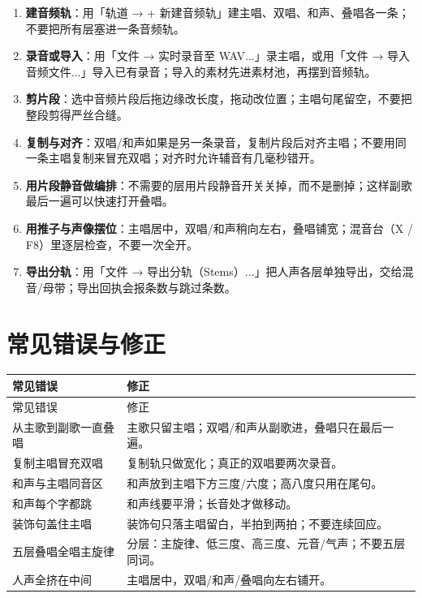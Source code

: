 \begin{enumerate}
\item \textbf{建音频轨}：用「轨道 → + 新建音频轨」建主唱、双唱、和声、叠唱各一条；不要把所有层塞进一条音频轨。
\item \textbf{录音或导入}：用「文件 → 实时录音至 WAV...」录主唱，或用「文件 → 导入音频文件...」导入已有录音；导入的素材先进素材池，再摆到音频轨。
\item \textbf{剪片段}：选中音频片段后拖边缘改长度，拖动改位置；主唱句尾留空，不要把整段剪得严丝合缝。
\item \textbf{复制与对齐}：双唱/和声如果是另一条录音，复制片段后对齐主唱；不要用同一条主唱复制来冒充双唱；对齐时允许辅音有几毫秒错开。
\item \textbf{用片段静音做编排}：不需要的层用片段静音开关关掉，而不是删掉；这样副歌最后一遍可以快速打开叠唱。
\item \textbf{用推子与声像摆位}：主唱居中，双唱/和声稍向左右，叠唱铺宽；混音台（X / F8）里逐层检查，不要一次全开。
\item \textbf{导出分轨}：用「文件 → 导出分轨（Stems）...」把人声各层单独导出，交给混音/母带；导出回执会报条数与跳过条数。
\end{enumerate}


\section{常见错误与修正}
\label{sec:vocal-mistakes}

\begin{longtable}{p{}p{}}
\toprule
常见错误 & 修正 \\
\midrule
\endfirsthead
\toprule
常见错误 & 修正 \\
\midrule
\endhead
从主歌到副歌一直叠唱 & 主歌只留主唱；双唱/和声从副歌进，叠唱只在最后一遍。 \\
复制主唱冒充双唱 & 复制轨只做宽化；真正的双唱要两次录音。 \\
和声与主唱同音区 & 和声放到主唱下方三度/六度；高八度只用在尾句。 \\
和声每个字都跳 & 和声线要平滑；长音处才做移动。 \\
装饰句盖住主唱 & 装饰句只落主唱留白，半拍到两拍；不要连续回应。 \\
五层叠唱全唱主旋律 & 分层：主旋律、低三度、高三度、元音/气声；不要五层同词。 \\
人声全挤在中间 & 主唱居中，双唱/和声/叠唱向左右铺开。 \\
\bottomrule
\end{longtable}

